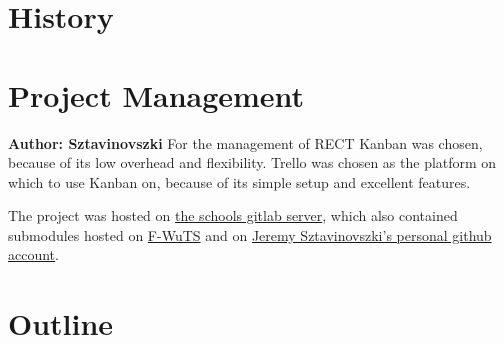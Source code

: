 \section{History}

\section{Project Management}
\textbf{Author: Sztavinovszki}
For the management of RECT Kanban was chosen, because of its low overhead and flexibility. Trello was chosen as the platform on which to use Kanban on, because of its simple setup and excellent features.

The project was hosted on \href{https://gitlab.htlwrn.ac.at/Sztavinovszki.Jeremy/RECT}{the schools gitlab server}, which also contained submodules hosted on \href{https://github.com/F-WuTS/}{F-WuTS} and on \href{https://github.com/if-loop69420}{Jeremy Sztavinovszki's personal github account}.

\section{Outline}





%

\filbreak
